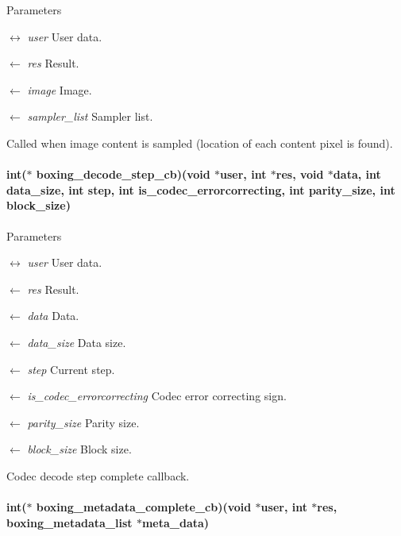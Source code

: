 \begin{DoxyParams}{Parameters}
\item[\mbox{$\leftrightarrow$} {\em user}]User data. \item[\mbox{$\leftarrow$} {\em res}]Result. \item[\mbox{$\leftarrow$} {\em image}]Image. \item[\mbox{$\leftarrow$} {\em sampler\_\-list}]Sampler list.\end{DoxyParams}
Called when image content is sampled (location of each content pixel is found). \hypertarget{group__unboxer_gaa152af7889b62277c3cd7dae89fd94a6}{
\paragraph[{boxing\_\-decode\_\-step\_\-cb}]{\setlength{\rightskip}{0pt plus 5cm}int($\ast$ {\bf boxing\_\-decode\_\-step\_\-cb})(void $\ast$user, int $\ast$res, void $\ast$data, int data\_\-size, int step, int is\_\-codec\_\-errorcorrecting, int parity\_\-size, int block\_\-size)}\hfill}
\label{group__unboxer_gaa152af7889b62277c3cd7dae89fd94a6}

\begin{DoxyParams}{Parameters}
\item[\mbox{$\leftrightarrow$} {\em user}]User data. \item[\mbox{$\leftarrow$} {\em res}]Result. \item[\mbox{$\leftarrow$} {\em data}]Data. \item[\mbox{$\leftarrow$} {\em data\_\-size}]Data size. \item[\mbox{$\leftarrow$} {\em step}]Current step. \item[\mbox{$\leftarrow$} {\em is\_\-codec\_\-errorcorrecting}]Codec error correcting sign. \item[\mbox{$\leftarrow$} {\em parity\_\-size}]Parity size. \item[\mbox{$\leftarrow$} {\em block\_\-size}]Block size.\end{DoxyParams}
Codec decode step complete callback. \hypertarget{group__unboxer_ga330e695e728124040d50ed2e615018f9}{
\paragraph[{boxing\_\-metadata\_\-complete\_\-cb}]{\setlength{\rightskip}{0pt plus 5cm}int($\ast$ {\bf boxing\_\-metadata\_\-complete\_\-cb})(void $\ast$user, int $\ast$res, boxing\_\-metadata\_\-list $\ast$meta\_\-data)}\hfill}
\label{group__unboxer_ga330e695e728124040d50ed2e615018f9}

